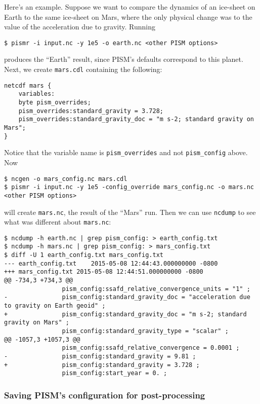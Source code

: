 Here's an example.  Suppose we want to compare the dynamics of an ice-sheet on Earth to the same ice-sheet on Mars, where the only physical change was to the value of the acceleration due to gravity.  Running
\begin{verbatim}
$ pismr -i input.nc -y 1e5 -o earth.nc <other PISM options>
\end{verbatim}
produces the ``Earth'' result, since PISM's defaults correspond to this planet.  Next, we create \texttt{mars.cdl} containing the following:
\small
\begin{verbatim}
netcdf mars {
    variables:
    byte pism_overrides;
    pism_overrides:standard_gravity = 3.728;
    pism_overrides:standard_gravity_doc = "m s-2; standard gravity on Mars";
}
\end{verbatim}
\normalsize
Notice that the variable name is \texttt{pism_overrides} and not \texttt{pism_config} above. Now
\small
\begin{verbatim}
$ ncgen -o mars_config.nc mars.cdl
$ pismr -i input.nc -y 1e5 -config_override mars_config.nc -o mars.nc <other PISM options>
\end{verbatim}
\normalsize
will create \texttt{mars.nc}, the result of the ``Mars'' run.  Then we can use \texttt{ncdump} to see what was different about \texttt{mars.nc}:
\small
\begin{verbatim}
$ ncdump -h earth.nc | grep pism_config: > earth_config.txt
$ ncdump -h mars.nc | grep pism_config: > mars_config.txt
$ diff -U 1 earth_config.txt mars_config.txt
--- earth_config.txt	2015-05-08 12:44:43.000000000 -0800
+++ mars_config.txt	2015-05-08 12:44:51.000000000 -0800
@@ -734,3 +734,3 @@
                pism_config:ssafd_relative_convergence_units = "1" ;
-               pism_config:standard_gravity_doc = "acceleration due to gravity on Earth geoid" ;
+               pism_config:standard_gravity_doc = "m s-2; standard gravity on Mars" ;
                pism_config:standard_gravity_type = "scalar" ;
@@ -1057,3 +1057,3 @@
                pism_config:ssafd_relative_convergence = 0.0001 ;
-               pism_config:standard_gravity = 9.81 ;
+               pism_config:standard_gravity = 3.728 ;
                pism_config:start_year = 0. ;
\end{verbatim}
\normalsize

\subsubsection*{Saving PISM's configuration for post-processing}
\label{sec:saving-pism-config}

